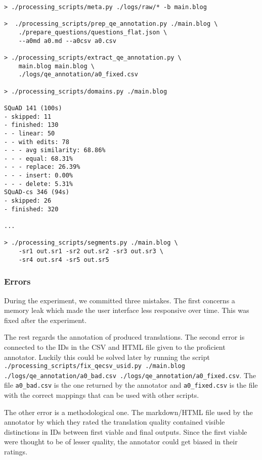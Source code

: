 \begin{lstlisting}[language=none,caption={Example of binary log file creation and manipulation}, label={lst:data_process_blog}]
> ./processing_scripts/meta.py ./logs/raw/* -b main.blog

>  ./processing_scripts/prep_qe_annotation.py ./main.blog \ 
    ./prepare_questions/questions_flat.json \ 
    --a0md a0.md --a0csv a0.csv

> ./processing_scripts/extract_qe_annotation.py \ 
    main.blog main.blog \
    ./logs/qe_annotation/a0_fixed.csv

> ./processing_scripts/domains.py ./main.blog 

SQuAD 141 (100s)
- skipped: 11
- finished: 130
- - linear: 50
- - with edits: 78
- - - avg similarity: 68.86%
- - - equal: 68.31%
- - - replace: 26.39%
- - - insert: 0.00%
- - - delete: 5.31%
SQuAD-cs 346 (94s)
- skipped: 26
- finished: 320

...

> ./processing_scripts/segments.py ./main.blog \ 
    -sr1 out.sr1 -sr2 out.sr2 -sr3 out.sr3 \
    -sr4 out.sr4 -sr5 out.sr5
\end{lstlisting}

\pagebreak
\subsubsection*{Errors} \label{subsubsec:experiment_leak}

During the experiment, we committed three mistakes. The first concerns a memory leak which made the user interface less responsive over time. This was fixed after the experiment.

The rest regards the annotation of produced translations. The second error is connected to the IDs in the CSV and HTML file given to the proficient annotator. Luckily this could be solved later by running the script \texttt{./processing\_scripts/fix\_qecsv\_usid.py ./main.blog ./logs/qe\_annotation/a0\_bad.csv ./logs/qe\_annotation/a0\_fixed.csv}. The file \texttt{a0\_bad.csv} is the one returned by the annotator and \texttt{a0\_fixed.csv} is the file with the correct mappings that can be used with other scripts.

The other error is a methodological one. The markdown/HTML file used by the annotator by which they rated the translation quality contained visible distinctions in IDs between first viable and final outputs. Since the first viable were thought to be of lesser quality, the annotator could get biased in their ratings.